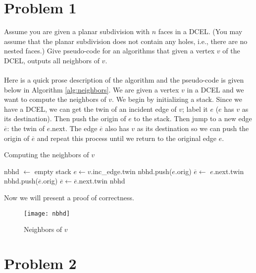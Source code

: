 \documentclass[11pt]{article}
\begin{document}

\newpage
\section*{Problem 1}

Assume you are given a planar subdivision with $n$ faces in a DCEL. (You may
assume that the planar subdivision does not contain any holes, i.e., there are
no nested faces.) Give pseudo-code for an algorithms that given a vertex $v$ of
the DCEL, outputs all neighbors of $v$. \\\\
\answer
Here is a quick prose description of the algorithm and the pseudo-code is given below in Algorithm \ref{alg:neighbors}.
We are given a vertex $v$ in a DCEL and we want to compute the neighbors of $v$.
We begin by initializing a stack.
Since we have a DCEL, we can get the twin of an incident edge of $v$; label it $e$ ($e$ has $v$ as its destination).
Then push the origin of $e$ to the stack.
Then jump to a new edge $\overline{e}$: the twin of $e$.next.
The edge $\overline{e}$ also has $v$ as its destination so we can push the origin of $\overline{e}$ and repeat this process until we return to the original edge $e$.

\begin{algorithm}
\caption{Computing the neighbors of $v$}
\label{alg:neighbors}
    \begin{algorithmic}[1]
        \State nbhd $\gets $ empty stack
        \State $e \gets v$.inc\_edge.twin
        \State nbhd.push($e$.orig)
        \State $\overline{e} \gets$ $e$.next.twin
            \State nbhd.push($\overline{e}$.orig)
            \State $\overline{e} \gets \overline{e}$.next.twin
        \EndWhile
        \State \Return nbhd
    \EndFunction
    \end{algorithmic}
\end{algorithm}

Now we will present a proof of correctness.

\begin{figure}[h]
   \centering
   \texttt{[image: nbhd]}
   \caption{Neighbors of $v$}
\end{figure}

\newpage
\section*{Problem 2}
\end{document}
